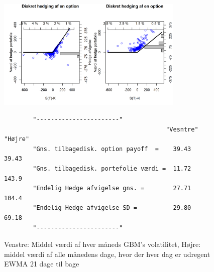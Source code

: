 \documentclass{article}
\theoremstyle{definition}
\theoremstyle{remark}
\begin{document}
\begin{figure}
    \centering
    \includegraphics[width=3.5in]{Overleaf/option_call_monthlyGBM_monthlyVIX100EWMA}
    \caption{Venstre: Middel værdi af hver måneds GBM's volatilitet, Højre: middel værdi af alle månedens dage, hvor der hver dag er udregent EWMA 21 dage til bage}
    \begin{verbatim}
        "-----------------------"                         
                                             "Vesntre"       "Højre"
        "Gns. tilbagedisk. option payoff  =    39.43          39.43
        "Gns. tilbagedisk. portefolie værdi =  11.72          143.9
        "Endelig Hedge afvigelse gns. =        27.71          104.4
        "Endelig Hedge afvigelse SD =          29.80          69.18
        "-----------------------"
    \end{verbatim}
    \label{fig:monthGBM}
\end{figure}
\end{document}
